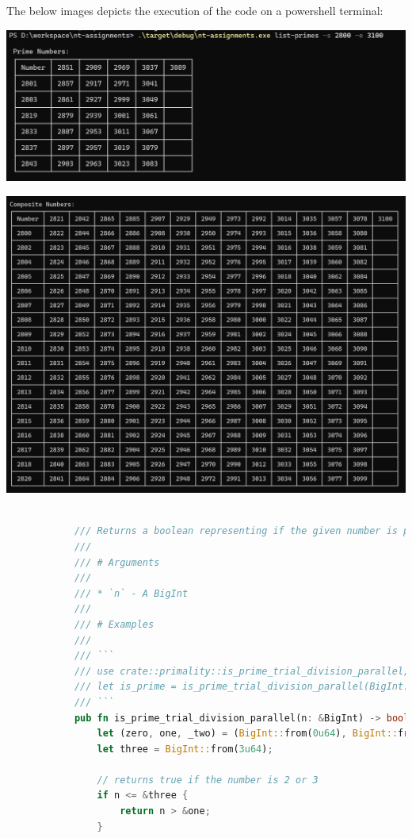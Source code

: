 \documentclass[11pt,a4paper]{article}
\begin{document}
\begin{enumerate}[1.]
\begin{flushleft}
			The below images depicts the execution of the code on a powershell terminal:

			\includegraphics[width=\textwidth]{primes.png}
			\label{figure1:primes}
			
			\includegraphics[width=\textwidth]{composites.png}
			\label{figure2:composites}

			\begin{lstlisting}[language=Rust, basicstyle=\tiny, caption=Prime Number Sieve]

			/// Returns a boolean representing if the given number is prime or not
			///
			/// # Arguments
			///
			/// * `n` - A BigInt
			///
			/// # Examples
			///
			/// ```
			/// use crate::primality::is_prime_trial_division_parallel;
			/// let is_prime = is_prime_trial_division_parallel(BigInt::from(100u64));
			/// ```
			pub fn is_prime_trial_division_parallel(n: &BigInt) -> bool {
				let (zero, one, _two) = (BigInt::from(0u64), BigInt::from(1u64), BigInt::from(2u64));
				let three = BigInt::from(3u64);
				
				// returns true if the number is 2 or 3
				if n <= &three {
					return n > &one;
				}
				

\end{lstlisting}
\end{flushleft}
\end{enumerate}
\end{document}
